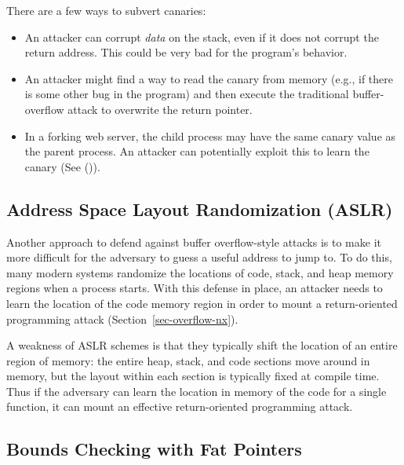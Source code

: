\documentclass[
  letterpaper,
]{scrbook}
\providecommand{\tightlist}{%
  \setlength{\itemsep}{0pt}\setlength{\parskip}{0pt}}
\theoremstyle{definition}
\theoremstyle{plain}
\theoremstyle{plain}
\theoremstyle{remark}
\begin{document}
There are a few ways to subvert canaries:

\begin{itemize}
\tightlist
\item
  An attacker can corrupt \emph{data} on the stack, even if it does not
  corrupt the return address. This could be very bad for the program's
  behavior.
\item
  An attacker might find a way to read the canary from memory (e.g., if
  there is some other bug in the program) and then execute the
  traditional buffer-overflow attack to overwrite the return pointer.
\item
  In a forking web server, the child process may have the same canary
  value as the parent process. An attacker can potentially exploit this
  to learn the canary (See ()).
\end{itemize}

\subsection{Address Space Layout Randomization
(ASLR)}\label{address-space-layout-randomization-aslr}

Another approach to defend against buffer overflow-style attacks is to
make it more difficult for the adversary to guess a useful address to
jump to. To do this, many modern systems randomize the locations of
code, stack, and heap memory regions when a process starts. With this
defense in place, an attacker needs to learn the location of the code
memory region in order to mount a return-oriented programming attack
(Section~\ref{sec-overflow-nx}).


A weakness of ASLR schemes is that they typically shift the location of
an entire region of memory: the entire heap, stack, and code sections
move around in memory, but the layout within each section is typically
fixed at compile time. Thus if the adversary can learn the location in
memory of the code for a single function, it can mount an effective
return-oriented programming attack.

\subsection{Bounds Checking with Fat
Pointers}\label{bounds-checking-with-fat-pointers}
\end{document}
